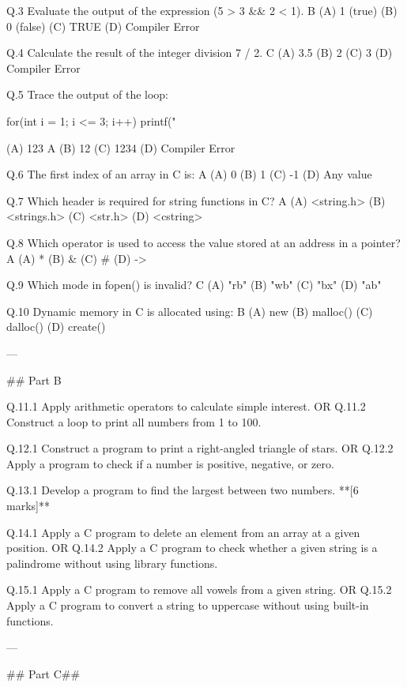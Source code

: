 Q.3 Evaluate the output of the expression (5 > 3 && 2 < 1).                              B
(A) 1 (true)
(B) 0 (false)
(C) TRUE
(D) Compiler Error

Q.4 Calculate the result of the integer division 7 / 2.                                 C
(A) 3.5
(B) 2
(C) 3
(D) Compiler Error

Q.5 Trace the output of the loop:


for(int i = 1; i <= 3; i++) {
    printf("%
}


(A) 123                                                                              A
(B) 12
(C) 1234
(D) Compiler Error

Q.6 The first index of an array in C is:                                           A
(A) 0
(B) 1
(C) -1
(D) Any value

Q.7 Which header is required for string functions in C?                              A
(A) <string.h>
(B) <strings.h>
(C) <str.h>
(D) <cstring>

Q.8 Which operator is used to access the value stored at an address in a pointer?            A
(A) *
(B) &
(C) #
(D) ->

Q.9 Which mode in fopen() is invalid?                                                C
(A) "rb"
(B) "wb"
(C) "bx"
(D) "ab"

Q.10   Dynamic memory in C is allocated using:                                         B
(A) new 
(B) malloc()
(C) dalloc()
(D) create()

---

## Part B

Q.11.1 Apply arithmetic operators to calculate simple interest.
OR
Q.11.2 Construct a loop to print all numbers from 1 to 100. 

Q.12.1 Construct a program to print a right-angled triangle of stars. 
OR
Q.12.2 Apply a program to check if a number is positive, negative, or zero. 

Q.13.1 Develop a program to find the largest between two numbers. **[6 marks]**

Q.14.1 Apply a C program to delete an element from an array at a given position. 
OR
Q.14.2 Apply a C program to check whether a given string is a palindrome without using library functions. 

Q.15.1 Apply a C program to remove all vowels from a given string. 
OR
Q.15.2 Apply a C program to convert a string to uppercase without using built-in functions. 

---

## Part C##

